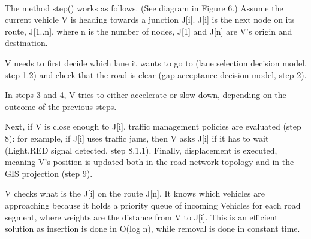 \documentclass[11pt]{article}
\begin{document}
\\
The method step() works as follows. (See diagram in Figure 6.) Assume the current vehicle V is heading towards a junction J[i]. J[i] is the next node on its route, J[1..n], where n is the number of nodes, J[1] and J[n] are V\textquoteright s origin and destination. 

V needs to first decide which lane it wants to go to (lane selection decision model, step 1.2) and check that the road is clear (gap acceptance decision model, step 2). 

In steps 3 and 4, V tries to either accelerate or slow down, depending on the outcome of the previous steps. 

Next, if V is close enough to J[i], traffic management policies are evaluated (step 8): for example, if J[i] uses traffic jams, then V asks J[i] if it has to wait (Light.RED signal detected, step 8.1.1). Finally, displacement is executed, meaning V\textquoteright s position is updated both in the road network topology and in the GIS projection (step 9).

V checks what is the J[i] on the route J[n]. It knows which vehicles are approaching because it holds a priority queue of incoming Vehicles for each road segment, where weights are the distance from V to J[i]. This is an efficient solution as insertion is done in O(log n), while removal is done in constant time.
\\
\end{document}
